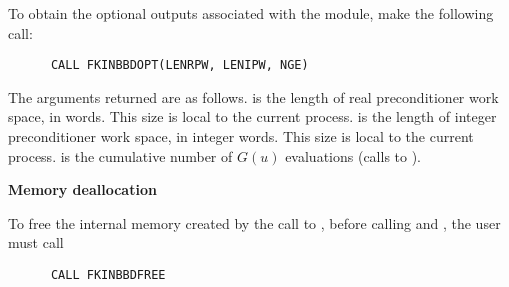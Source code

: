 \begin{Steps}
  To obtain the optional outputs associated with the {\kinbbdpre} module, make
  the following call:
\begin{verbatim}
      CALL FKINBBDOPT(LENRPW, LENIPW, NGE)
\end{verbatim}
  The arguments returned are as follows.
   is the length of real preconditioner work space, in 
  words.  This size is local to the current process.
   is the length of integer preconditioner work space, in integer
  words.  This size is local to the current process.
   is the cumulative number of $G(u)$ evaluations (calls to ).
  
\item {\bf Memory deallocation}

  To free the internal memory created by the call to , before
  calling  and , the user must call
\begin{verbatim}
      CALL FKINBBDFREE
\end{verbatim}

\end{Steps}
